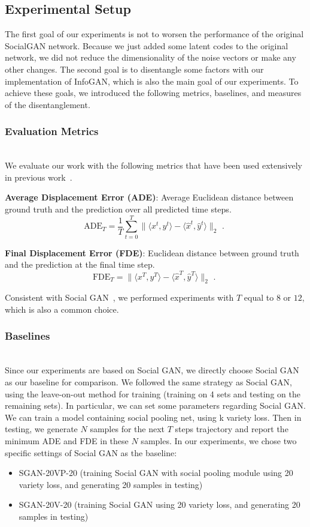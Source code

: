 \subsection{Experimental Setup}
The first goal of our experiments is not to worsen the performance of the original SocialGAN network. Because we just added some latent codes to the original network, we did not reduce the dimensionality of the noise vectors or make any other changes. The second goal is to disentangle some factors with our implementation of InfoGAN, which is also the main goal of our experiments. To achieve these goals, we introduced the following metrics, baselines, and measures of the disentanglement.

\subsubsection{Evaluation Metrics}
\hfill \\
We evaluate our work with the following metrics that have been used extensively in previous work~\cite{Gupta_2018_CVPR, distant_prediction, Alahi16}.

\textbf{Average Displacement Error (ADE)}:  Average Euclidean distance between ground truth and the prediction over all predicted time steps.
$$\text{ADE}_{T} = \frac 1 T \sum_{t=0}^{T} \lVert \langle x^t, y^t \rangle - \langle \hat x^t, \hat y^t \rangle \lVert_{2} \text{ . }$$

\textbf{Final Displacement Error (FDE)}: Euclidean distance between ground truth and the prediction at the final time step.
$$\text{FDE}_{T} = \lVert \langle x^T, y^T \rangle - \langle \hat x^T, \hat y^T \rangle \lVert_{2} \text{ . }$$

Consistent with Social GAN~\cite{Gupta_2018_CVPR}, we performed experiments with $T$ equal to $8$ or $12$, which is also a common choice.


\subsubsection{Baselines}
\hfill \\
Since our experiments are based on Social GAN, we directly choose Social GAN as our baseline for comparison. We followed the same strategy as Social GAN, using the leave-on-out method for training (training on 4 sets and testing on the remaining sets). In particular,  we can set some parameters regarding Social GAN. We can train a model containing social pooling net, using k variety loss. Then in testing, we generate $N$ samples for the next $T$ steps trajectory and report the minimum ADE and FDE in these $N$ samples. In our experiments, we chose two specific settings of Social GAN as the baseline:
\begin{itemize}
  \item SGAN-20VP-20 (training Social GAN with social pooling module using 20 variety loss, and generating 20 samples in testing)
  \item SGAN-20V-20 (training Social GAN using 20 variety loss, and generating 20 samples in testing)
\end{itemize}

